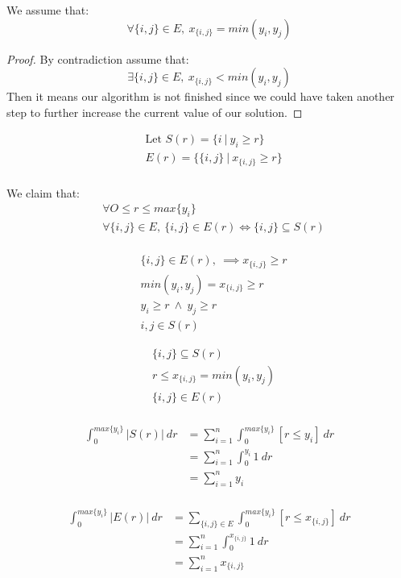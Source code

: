 \documentclass[]{article}
\begin{document}
	We assume that:
	\[
	\forall \{i, j\} \in E,\ x_{\{i, j\}} = min(y_i, y_j)
	\]
	\begin{proof}

	By contradiction assume that:
	\[
	\exists \{i, j\} \in E,\ x_{\{i, j\}} < min(y_i, y_j)
	\]
	Then it means our algorithm is not finished since we could have taken another step to further increase the current value of our solution.
		
	\end{proof}

	\begin{align*}
	&\text{Let } S(r) = \{i\ |\ y_i \geq r\}\\
	&E(r) = \{\{i, j\}\ |\ x_{\{i, j\}} \geq r \}\\
	\end{align*}
	
	We claim that: 
	\begin{align*}
	&\forall O \leq r \leq max\{y_i\}\\
	&\forall \{i, j\} \in E,\ \{i, j\} \in E(r) \iff \{i, j \} \subseteq S(r)\\
	\end{align*}
	
	\begin{align*}
	&\{i, j\} \in E(r),\ \implies  x_{\{i, j\}} \geq r\\
	&min(y_i, y_j) =  x_{\{i, j\}} \geq r\\
	&y_i \geq r\ \wedge\ y_j \geq r\\
	& i,j \in S(r)
	\end{align*}
	
	\begin{align*}
	&\{i, j\} \subseteq S(r)\\
	&r\leq  x_{\{i, j\}} = min(y_i, y_j)\\
	&\{i, j\} \in E(r)\\
	\end{align*}
	
	\begin{align*}
	\int_{0}^{max\{y_i\}}|S(r)|\ dr &= \sum_{i=1}^{n} \int_{0}^{max\{y_i\}} [r\leq y_i]\ dr\\
								  &= \sum_{i=1}^{n} \int_{0}^{y_i} 1\ dr\\
								  &= \sum_{i=1}^{n} y_i\\
	\end{align*}
	
	\begin{align*}
	\int_{0}^{max\{y_i\}} |E(r)|\ dr &= \sum_{\{i, j\} \in E} \int_{0}^{max\{y_i\}} [r\leq x_{\{i, j\}}]\ dr\\
								   &= \sum_{i=1}^{n} \int_{0}^{x_{\{i, j\}}} 1\ dr\\
								   &= \sum_{i=1}^{n} x_{\{i, j\}}\\
	\end{align*}
	
\end{document}

